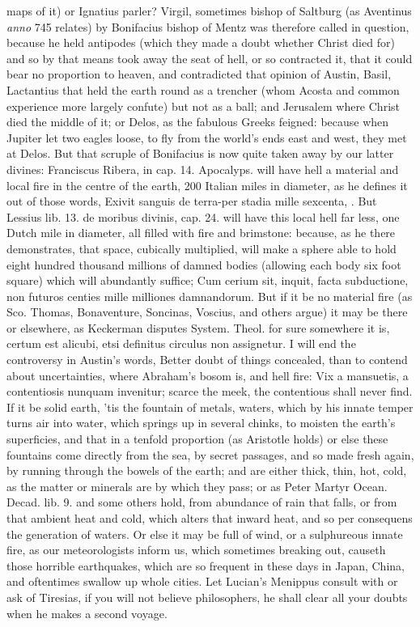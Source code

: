 {maps of it) or Ignatius parler? Virgil, sometimes bishop of
Saltburg (as Aventinus \emph{anno} 745 relates) by Bonifacius bishop of
Mentz was therefore called in question, because he held antipodes
(which they made a doubt whether Christ died for) and so by that means
took away the seat of hell, or so contracted it, that it could bear no
proportion to heaven, and contradicted that opinion of Austin, Basil,
Lactantius that held the earth round as a trencher (whom Acosta and
common experience more largely confute) but not as a ball; and
Jerusalem where Christ died the middle of it; or Delos, as the fabulous
Greeks feigned: because when Jupiter let two eagles loose, to fly from
the world's ends east and west, they met at Delos. But that scruple of
Bonifacius is now quite taken away by our latter divines: Franciscus
Ribera, in cap. 14. Apocalyps. will have hell a material and local fire
in the centre of the earth, 200 Italian miles in diameter, as he
defines it out of those words, Exivit sanguis de terra-per stadia mille
sexcenta, \etc{}. But Lessius lib. 13. de moribus divinis, cap. 24. will
have this local hell far less, one Dutch mile in diameter, all filled
with fire and brimstone: because, as he there demonstrates, that space,
cubically multiplied, will make a sphere able to hold eight hundred
thousand millions of damned bodies (allowing each body six foot square)
which will abundantly suffice; Cum cerium sit, inquit, facta
subductione, non futuros centies mille milliones damnandorum. But if it
be no material fire (as Sco. Thomas, Bonaventure, Soncinas, Voscius,
and others argue) it may be there or elsewhere, as Keckerman disputes
System. Theol. for sure somewhere it is, certum est alicubi, etsi
definitus circulus non assignetur. I will end the controversy in
Austin's words, Better doubt of things concealed, than to contend
about uncertainties, where Abraham's bosom is, and hell fire: Vix
a mansuetis, a contentiosis nunquam invenitur; scarce the meek, the
contentious shall never find. If it be solid earth, 'tis the fountain
of metals, waters, which by his innate temper turns air into water,
which springs up in several chinks, to moisten the earth's superficies,
and that in a tenfold proportion (as Aristotle holds) or else these
fountains come directly from the sea, by secret passages, and so
made fresh again, by running through the bowels of the earth; and are
either thick, thin, hot, cold, as the matter or minerals are by which
they pass; or as Peter Martyr Ocean. Decad. lib. 9. and some others
hold, from  abundance of rain that falls, or from that ambient
heat and cold, which alters that inward heat, and so per consequens the
generation of waters. Or else it may be full of wind, or a sulphureous
innate fire, as our meteorologists inform us, which sometimes breaking
out, causeth those horrible earthquakes, which are so frequent in these
days in Japan, China, and oftentimes swallow up whole cities. Let
Lucian's Menippus consult with or ask of Tiresias, if you will not
believe philosophers, he shall clear all your doubts when he makes a
second voyage.

}
